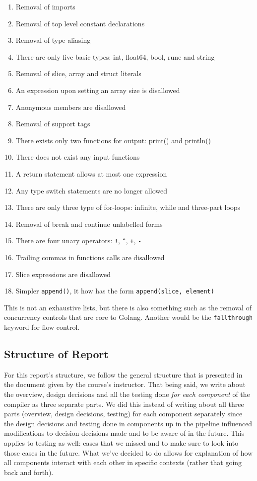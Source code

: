 \documentclass{article}
\begin{document}
\begin{enumerate}
    \item Removal of imports
    \item Removal of top level constant declarations
    \item Removal of type aliasing
    \item There are only five basic types: int, float64, bool, rune and string
    \item Removal of slice, array and struct literals
    \item An expression upon setting an array size is disallowed
    \item Anonymous members are disallowed
    \item Removal of support tags
    \item There exists only two functions for output: print() and println()
    \item There does not exist any input functions
    \item A return statement allows at most one expression
    \item Any type switch statements are no longer allowed
    \item There are only three type of for-loops: infinite, while and three-part loops
    \item Removal of break and continue unlabelled forms
    \item There are four unary operators: \verb|!|, \verb|^|, \verb|+|, \verb|-|
    \item Trailing commas in functions calls are disallowed
    \item Slice expressions are disallowed
    \item Simpler \texttt{append()}, it how has the form \texttt{append(slice, element)}
\end{enumerate}

This is not an exhaustive lists, but there is also something such as the removal of concurrency controls that are core to Golang. Another would be the \texttt{fallthrough} keyword for flow control.

\subsection{Structure of Report}

For this report's structure, we follow the general structure that is presented in the document given by the course's instructor. That being said, we write about the overview, design decisions and all the testing done \textit{for each component} of the compiler as three separate parts. We did this instead of writing about all three parts (overview, design decisions, testing) for each component separately since the design decisions and testing done in components up in the pipeline influenced modifications to decision decisions made and to be aware of in the future. This applies to testing as well: cases that we missed and to make sure to look into those cases in the future. What we've decided to do allows for explanation of how all components interact with each other in specific contexts (rather that going back and forth).
\end{document}
